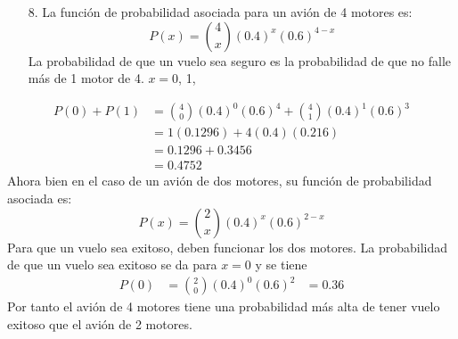 \documentclass[10pt,letterpaper]{article}
\author{Germán Avendaño Ramírez}
\begin{document}
\begin{itemize}
\item[8.] La función de probabilidad asociada para un avi\'{o}n de 4 motores es:
\[P(x)=\displaystyle{4 \choose x}(0.4)^{x}(0.6)^{4-x}\]
La probabilidad de que un vuelo sea seguro es la probabilidad de que no falle más de 1 motor de 4.
$x=0$, 1, 
\end{itemize}
\begin{align*}
P(0)+P(1)&=\displaystyle{4 \choose 0}(0.4)^{0}(0.6)^{4}+\displaystyle{4 \choose 1}(0.4)^{1}(0.6)^{3}\\
&=1(0.1296)+4(0.4)(0.216)\\
&=0.1296+0.3456\\
&=0.4752
\end{align*}
Ahora bien en el caso de un avión de dos motores, su función de probabilidad asociada es:
\[P(x)=\displaystyle{2\choose x}(0.4)^{x}(0.6)^{2-x}\]
Para que un vuelo sea exitoso, deben funcionar los dos motores. La probabilidad de que un vuelo sea exitoso se da para $x=0$ y se tiene
\begin{align*}
P(0)&=\displaystyle{2\choose 0}(0.4)^{0}(0.6)^{2}
&=0.36
\end{align*}
Por tanto el avión de 4 motores tiene una probabilidad más alta de tener vuelo exitoso que el avión de 2 motores.
\end{document}
